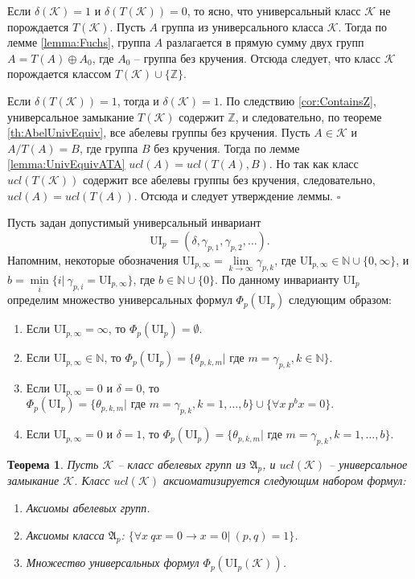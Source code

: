 \documentclass[a4paper,11pt,twoside]{article}
\newtheorem{theorem}{Теорема}[section]
\def\proof{{\noindent{\bf Доказательство.}} }
\def\A{{\mathfrak{A}}}
\def\K{{\mathcal{K}}}
\def\Z{{\mathbb{Z}}}
\def\N{{\mathbb{N}}}
\def\ui{{\mathrm{UI}}}
\begin{document}
\proof Если $\delta(\K) = 1$ и $\delta(T(\K)) = 0$, то ясно, что универсальный класс $\K$ не порождается $T(\K)$. Пусть $A$ группа из универсального класса $\K$. Тогда по лемме \ref{lemma:Fuchs}, группа $A$ разлагается в прямую сумму двух групп $A = T(A) \oplus A_0$, где $A_0$ -- группа без кручения. Отсюда следует, что класс $\K$ порождается классом $T(\K) \cup \{\Z\}.$

Если $\delta(T(\K)) = 1$, тогда и $\delta(\K) = 1$. По следствию \ref{cor:ContainsZ}, универсальное замыкание $T(\K)$ содержит $\Z$, и следовательно, по теореме \ref{th:AbelUnivEquiv}, все абелевы группы без кручения. Пусть $A \in \K$ и $A \big/ T(A) = B$, где группа $B$ без кручения. Тогда по лемме \ref{lemma:UnivEquivATA} $ucl(A) = ucl(T(A), B).$ Но так как класс $ucl(T(\K))$ содержит все абелевы группы без кручения, следовательно, $ucl(A) = ucl(T(A))$. Отсюда и следует утверждение леммы. $\square$


Пусть задан допустимый универсальный инвариант 
$$\ui_p = (\delta, \gamma_{p,1}, \gamma_{p,2}, \ldots).$$ 
Напомним, некоторые обозначения $\ui_{p,\infty} = \lim\limits_{k \rightarrow \infty} \gamma_{p,k}$, где $\ui_{p,\infty} \in \N \cup \{0, \infty\}$, и $b = \min\limits_{i}\{i | \ \gamma_{p,i} = \ui_{p, \infty}\}$, где $b \in \N \cup \{0\}$. По данному инварианту $\ui_p$ определим множество универсальных формул $\Phi_p(\ui_p)$ следующим образом:
\begin{enumerate}
\item Если $\ui_{p,\infty} = \infty$, то $\Phi_p(\ui_p) = \emptyset.$
\item Если $\ui_{p, \infty} \in \N$, то $\Phi_p(\ui_p) = \{\theta_{p,k,m} | \text{ где } m = \gamma_{p,k}, k \in \N\}.$
\item Если $\ui_{p, \infty} = 0$ и $\delta = 0$, то $\Phi_p(\ui_p) = \{\theta_{p,k,m} | \text{ где } m = \gamma_{p,k}, k = 1,\ldots,b\} \cup \{\forall x \ p^b x = 0\}.$
\item Если $\ui_{p, \infty} = 0$ и $\delta = 1$, то $\Phi_p(\ui_p) = \{\theta_{p,k,m} | \text{ где } m = \gamma_{p,k}, k = 1, \ldots, b\}.$
\end{enumerate}


\begin{theorem}
Пусть $\K$ -- класс абелевых групп из $\A_p$, и $ucl(\K)$ -- универсальное замыкание $\K$. Класс $ucl(\K)$ аксиоматизируется следующим набором формул:
\begin{enumerate}
\item Аксиомы абелевых групп.
\item Аксиомы класса $\A_p$: $\{ \forall x \ qx = 0 \rightarrow x = 0 | \ (p,q) = 1 \}$.
\item Множество универсальных формул $\Phi_p(\ui_p(\K))$.
\end{enumerate}
\end{theorem}
\end{document}
